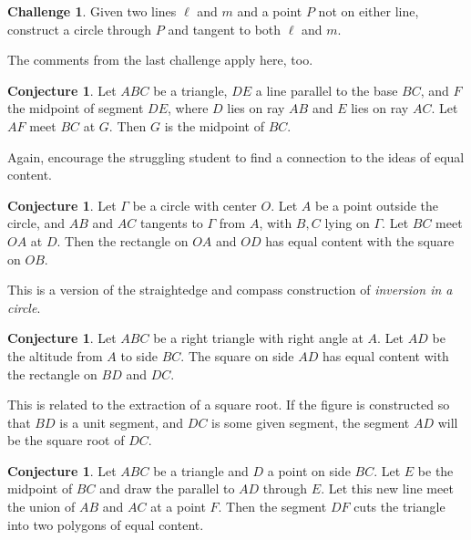 \documentclass{tufte-handout}
\theoremstyle{definition}
\newtheorem{conjecture}[problem]{Conjecture}
\newtheorem{challenge}[problem]{Challenge}
\begin{document}
\begin{challenge}\label{chal:circle-point-two-tangents}
Given two lines $\ell$ and $m$ and a point $P$ not on either line, construct a circle through $P$ and tangent to both $\ell$ and $m$.
\end{challenge}

The comments from the last challenge apply here, too.


\begin{conjecture}\label{conj:content-triangle}
Let $ABC$ be a triangle, $DE$ a line parallel to the base $BC$, and $F$ the midpoint of segment $DE$, where $D$ lies on ray $AB$ and $E$ lies on ray $AC$. Let $AF$ meet $BC$ at $G$. Then $G$ is the midpoint of $BC$.
\end{conjecture}

Again, encourage the struggling student to find a connection to the ideas of equal content. 

\begin{conjecture}\label{conj:content-circle}
Let $\Gamma$ be a circle with center $O$. Let $A$ be a point outside the circle, and $AB$ and $AC$ tangents to $\Gamma$ from $A$, with $B, C$ lying on $\Gamma$. Let $BC$ meet $OA$ at $D$. Then the rectangle on $OA$ and $OD$ has equal content with the square on $OB$.
\end{conjecture}

This is a version of the straightedge and compass construction of \emph{inversion in a circle}.

\begin{conjecture}\label{conj:right-triangle-similarity}
Let $ABC$ be a right triangle with right angle at $A$. Let $AD$ be the altitude from $A$ to side $BC$. The square on side $AD$ has equal content with the rectangle on $BD$ and $DC$.
\end{conjecture}

This is related to the extraction of a square root. If the figure is constructed so that $BD$ is a unit segment, and $DC$ is some given segment, the segment $AD$ will be the square root of $DC$.


\begin{conjecture}\label{conj:divide-triangle}
Let $ABC$ be a triangle and $D$ a point on side $BC$. Let $E$ be the midpoint of $BC$ and draw the parallel to $AD$ through $E$. Let this new line meet the union of $AB$ and $AC$ at a point $F$. Then the segment $DF$ cuts the triangle into two polygons of equal content.
\end{conjecture}
\end{document}
